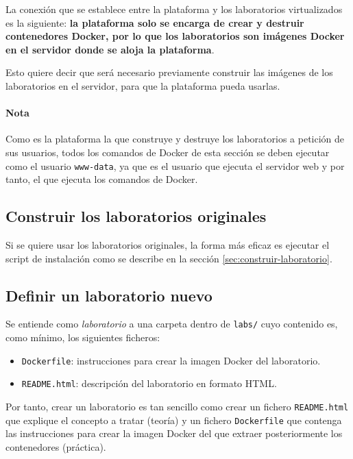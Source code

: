 \begin{appendices}
            La conexión que se establece entre la plataforma y los laboratorios virtualizados es la siguiente: \textbf{la plataforma solo se encarga de crear y destruir contenedores Docker, por lo que los laboratorios son imágenes Docker en el servidor donde se aloja la plataforma}.

            Esto quiere decir que será necesario previamente construir las imágenes de los laboratorios en el servidor, para que la plataforma pueda usarlas.

            \paragraph{Nota}

                Como es la plataforma la que construye y destruye los laboratorios a petición de sus usuarios, todos los comandos de Docker de esta sección se deben ejecutar como el usuario \texttt{www-data}, ya que es el usuario que ejecuta el servidor web y por tanto, el que ejecuta los comandos de Docker.

            \subsection{Construir los laboratorios originales}

                Si se quiere usar los laboratorios originales, la forma más eficaz es ejecutar el script de instalación como se describe en la sección \ref{sec:construir-laboratorio}.

            \subsection{Definir un laboratorio nuevo}

                Se entiende como \textit{laboratorio} a una carpeta dentro de \texttt{labs/} cuyo contenido es, como mínimo, los siguientes ficheros:
                
                \begin{itemize}
                    \item \texttt{Dockerfile}: instrucciones para crear la imagen Docker del laboratorio.
                    \item \texttt{README.html}: descripción del laboratorio en formato HTML.
                \end{itemize}

                Por tanto, crear un laboratorio es tan sencillo como crear un fichero \texttt{README.html} que explique el concepto a tratar (teoría) y un fichero \texttt{Dockerfile} que contenga las instrucciones para crear la imagen Docker del que extraer posteriormente los contenedores (práctica).


\end{appendices}
